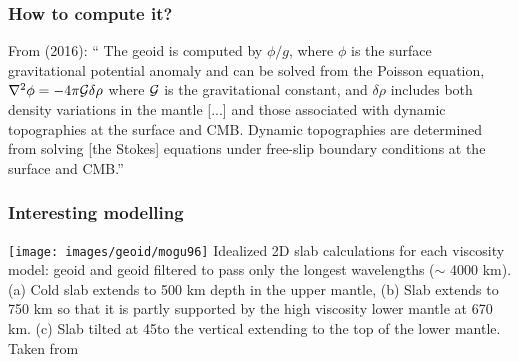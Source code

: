 \subsubsection{How to compute it?}

From \textcite{lizh16} (2016): ``
The geoid is computed by $\phi/g$, where $\phi$ is the surface gravitational potential anomaly 
and can be solved from the Poisson equation,
$ \nabla^2 \phi = -4\pi {\cal G} \delta\rho$ 
where ${\cal G}$ is the gravitational constant, and $\delta\rho$ 
includes both density variations in the mantle [...]
and those associated with dynamic topographies at the surface and CMB. 
Dynamic topographies are determined from solving [the Stokes] equations 
under free-slip boundary conditions at the surface and CMB.''


\subsubsection{Interesting modelling}

\begin{center}
\texttt{[image: images/geoid/mogu96]}
{\scriptsize Idealized 2D slab calculations for each viscosity model: geoid and geoid filtered 
to pass only the longest wavelengths ($\sim$ 4000 km).
(a) Cold slab extends to 500 km depth in the upper mantle, 
(b) Slab extends to 750 km so that it is partly supported by the high viscosity lower mantle at 670 km. 
(c) Slab tilted at 45\degree to the vertical extending to the top of the lower mantle. 
Taken from \cite{mogu96}}
\end{center}
